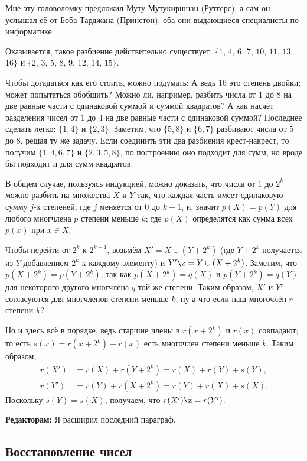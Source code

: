 Мне эту головоломку предложил Муту Мутукиршнан (Рутгерс),
а сам он услышал её от Боба Тарджана (Принстон);
оба они выдающиеся специалисты по информатике.

Оказывается, такое разбиение действительно существует: $\{1$, $4$, $6$, $7$, $10$, $11$, $13$, $16\}$ и $\{2$, $3$, $5$, $8$, $9$, $12$, $14$, $15\}$.

Чтобы догадаться как его стоить, можно подумать:
А ведь $16$ это степень двойки;
может попытаться обобщить?
Можно ли, например, разбить числа от $1$ до $8$ на две равные части с одинаковой суммой и суммой квадратов?
А как насчёт разделения чисел от $1$ до $4$ на две равные части с одинаковой суммой?
Последнее сделать легко: $\{1, 4\}$ и $\{2, 3\}$.
Заметим, что $\{5, 8\}$ и $\{6, 7\}$ разбивают числа от $5$ до $8$, решая ту же задачу.
Если соединить эти два разбиения крест-накрест, то получим $\{1, 4, 6, 7\}$ и $\{2, 3, 5, 8\}$, по построению оно подходит для сумм, но вроде бы подходит и для сумм квадратов.

В общем случае, пользуясь индукцией, можно доказать, что числа от $1$ до $2^k$ можно разбить на множества $X$ и $Y$ так, что каждая часть имеет одинаковую сумму $j$-х степеней, где $j$ меняется от $0$ до $k - 1$, и, значит $p(X)=p(Y)$ для любого многчлена $p$ степени меньше $k$;
где $p(X)$ определятся как сумма всех $p(x)$ при $x \in X$.

Чтобы перейти от $2^{k}$ к $2^{k+1}$, возьмём $X' = X \cup (Y + 2^k)$
(где $Y + 2^k$ получается из $Y$ добавлением $2^k$ к каждому элементу) и $Y' \z= Y \cup (X + 2^k)$.
Заметим, что $p(X + 2^k) = p(Y + 2^k)$,
так как $p(X + 2^k)=q(X)$ и $p(Y + 2^k)=q(Y)$ для некоторого другого многчлена $q$ той же степени.
Таким образом, $X'$ и $Y'$ согласуются для многчленов степени меньше $k$, ну а что если наш многочлен $r$ степени $k$?

Но и здесь всё в порядке, ведь старшие члены в $r(x+2^k)$ и $r(x)$ совпадают;
то есть $s(x)=r(x+2^k)-r(x)$ есть многочлен степени меньше $k$.
Таким образом,
\begin{align*}
r(X')&=r(X)+r(Y+2^k)=r(X)+r(Y)+s(Y),
\\
r(Y')&=r(Y)+r(X+2^k)=r(Y)+r(X)+s(X).
\end{align*}
Поскольку $s(Y)=s(X)$, получаем, что $r(X')\z=r(Y')$.


\begin{addedbytheeditors}
\textbf{Редакторам:} Я расширил последний параграф.
\end{addedbytheeditors}

\subsection*{Восстановление чисел}

